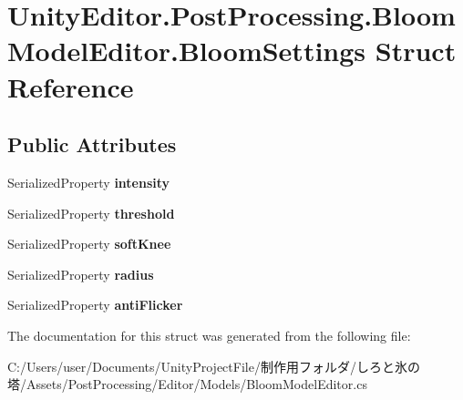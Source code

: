 \hypertarget{struct_unity_editor_1_1_post_processing_1_1_bloom_model_editor_1_1_bloom_settings}{}\section{Unity\+Editor.\+Post\+Processing.\+Bloom\+Model\+Editor.\+Bloom\+Settings Struct Reference}
\label{struct_unity_editor_1_1_post_processing_1_1_bloom_model_editor_1_1_bloom_settings}
\subsection*{Public Attributes}
\begin{DoxyCompactItemize}
\item 
\mbox{\label{struct_unity_editor_1_1_post_processing_1_1_bloom_model_editor_1_1_bloom_settings_a09c66b0e20e4233355483d76b81e73bc}} 
Serialized\+Property {\bfseries intensity}
\item 
\mbox{\label{struct_unity_editor_1_1_post_processing_1_1_bloom_model_editor_1_1_bloom_settings_a299f7c291fe3d967520ad38b2922f3cd}} 
Serialized\+Property {\bfseries threshold}
\item 
\mbox{\label{struct_unity_editor_1_1_post_processing_1_1_bloom_model_editor_1_1_bloom_settings_a19ef4b30d4df00e82c69a18700fca473}} 
Serialized\+Property {\bfseries soft\+Knee}
\item 
\mbox{\label{struct_unity_editor_1_1_post_processing_1_1_bloom_model_editor_1_1_bloom_settings_a401821be1cf0d6db3a91df19ff7ab56b}} 
Serialized\+Property {\bfseries radius}
\item 
\mbox{\label{struct_unity_editor_1_1_post_processing_1_1_bloom_model_editor_1_1_bloom_settings_a4163d2095dfa7125615d4b591492de0e}} 
Serialized\+Property {\bfseries anti\+Flicker}
\end{DoxyCompactItemize}


The documentation for this struct was generated from the following file\+:\begin{DoxyCompactItemize}
\item 
C\+:/\+Users/user/\+Documents/\+Unity\+Project\+File/制作用フォルダ/しろと氷の塔/\+Assets/\+Post\+Processing/\+Editor/\+Models/Bloom\+Model\+Editor.\+cs\end{DoxyCompactItemize}
